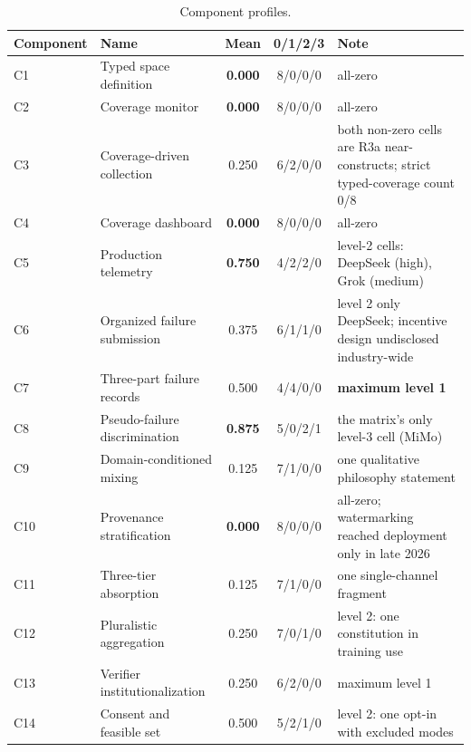 \documentclass[10pt]{article}
\begin{document}
\begin{table}[t]
\centering
\caption{Component profiles.}
\label{tab:components}
\small
\begin{tabularx}{\textwidth}{l l c c Y}
\toprule
Component & Name & Mean & 0/1/2/3 & Note \\
\midrule
C1 & Typed space definition & \textbf{0.000} & 8/0/0/0 & all-zero \\
C2 & Coverage monitor & \textbf{0.000} & 8/0/0/0 & all-zero \\
C3 & Coverage-driven collection & 0.250 & 6/2/0/0 & both non-zero cells are R3a near-constructs; strict typed-coverage count 0/8 \\
C4 & Coverage dashboard & \textbf{0.000} & 8/0/0/0 & all-zero \\
C5 & Production telemetry & \textbf{0.750} & 4/2/2/0 & level-2 cells: DeepSeek (high), Grok (medium) \\
C6 & Organized failure submission & 0.375 & 6/1/1/0 & level 2 only DeepSeek; incentive design undisclosed industry-wide \\
C7 & Three-part failure records & 0.500 & 4/4/0/0 & \textbf{maximum level 1} \\
C8 & Pseudo-failure discrimination & \textbf{0.875} & 5/0/2/1 & the matrix's only level-3 cell (MiMo) \\
C9 & Domain-conditioned mixing & 0.125 & 7/1/0/0 & one qualitative philosophy statement \\
C10 & Provenance stratification & \textbf{0.000} & 8/0/0/0 & all-zero; watermarking reached deployment only in late 2026 \\
C11 & Three-tier absorption & 0.125 & 7/1/0/0 & one single-channel fragment \\
C12 & Pluralistic aggregation & 0.250 & 7/0/1/0 & level 2: one constitution in training use \\
C13 & Verifier institutionalization & 0.250 & 6/2/0/0 & maximum level 1 \\
C14 & Consent and feasible set & 0.500 & 5/2/1/0 & level 2: one opt-in with excluded modes \\
\bottomrule
\end{tabularx}
\end{table}
\end{document}
